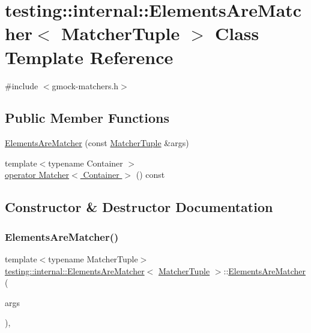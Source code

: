 \hypertarget{classtesting_1_1internal_1_1_elements_are_matcher}{}\section{testing\+:\+:internal\+:\+:Elements\+Are\+Matcher$<$ Matcher\+Tuple $>$ Class Template Reference}
\label{classtesting_1_1internal_1_1_elements_are_matcher}


{\ttfamily \#include $<$gmock-\/matchers.\+h$>$}

\subsection*{Public Member Functions}
\begin{DoxyCompactItemize}
\item 
\hyperlink{classtesting_1_1internal_1_1_elements_are_matcher_a563d71088c4909ab46987e3cd28f2ad6}{Elements\+Are\+Matcher} (const \hyperlink{structtesting_1_1internal_1_1_matcher_tuple}{Matcher\+Tuple} \&args)
\item 
{\footnotesize template$<$typename Container $>$ }\\\hyperlink{classtesting_1_1internal_1_1_elements_are_matcher_a6e6eaf8918c5d581b4b62ece23559be9}{operator Matcher$<$ Container $>$} () const
\end{DoxyCompactItemize}


\subsection{Constructor \& Destructor Documentation}
\mbox{\label{classtesting_1_1internal_1_1_elements_are_matcher_a563d71088c4909ab46987e3cd28f2ad6}} 
\subsubsection{\texorpdfstring{Elements\+Are\+Matcher()}{ElementsAreMatcher()}}
{\footnotesize\ttfamily template$<$typename Matcher\+Tuple$>$ \\
\hyperlink{classtesting_1_1internal_1_1_elements_are_matcher}{testing\+::internal\+::\+Elements\+Are\+Matcher}$<$ \hyperlink{structtesting_1_1internal_1_1_matcher_tuple}{Matcher\+Tuple} $>$\+::\hyperlink{classtesting_1_1internal_1_1_elements_are_matcher}{Elements\+Are\+Matcher} (\begin{DoxyParamCaption}\item[{const \hyperlink{structtesting_1_1internal_1_1_matcher_tuple}{Matcher\+Tuple} \&}]{args }\end{DoxyParamCaption})\hspace{0.3cm}{\ttfamily [inline]}, {\ttfamily [explicit]}}



